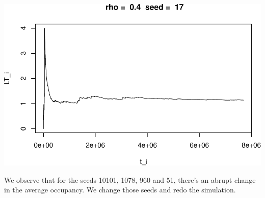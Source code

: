 \documentclass[]{article}
\begin{document}
\includegraphics{003_files/figure-latex/unnamed-chunk-14-10.pdf}

We observe that for the seeds 10101, 1078, 960 and 51, there's an abrupt
change in the average occupancy. We change those seeds and redo the
simulation.
\end{document}
